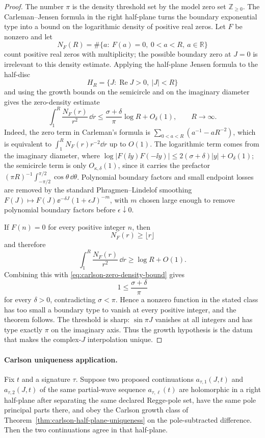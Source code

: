 \begin{proof}
The number \(\pi\) is the density threshold set by the model zero set
\(\mathbb Z_{\ge0}\).  The Carleman--Jensen formula in the right half-plane
turns the boundary exponential type into a bound on the logarithmic density of
positive real zeros.  Let \(F\) be nonzero and let
\[
  N_F(R)=\#\{a:\ F(a)=0,\ 0<a<R,\ a\in\mathbb R\}
\]
count positive real zeros with multiplicity; the possible boundary zero at
\(J=0\) is irrelevant to this density estimate.  Applying the half-plane
Jensen formula to the half-disc
\[
  H_R=\{J:\operatorname{Re}J>0,\ |J|<R\}
\]
and using the growth bounds on the semicircle and on the imaginary diameter
gives the zero-density estimate
\begin{equation}
  \int_1^R \frac{N_F(r)}{r^2}\,\dd r
  \le
  \frac{\sigma+\delta}{\pi}\log R+O_\delta(1),
  \qquad R\to\infty .
  \label{eq:carlson-zero-density-bound}
\end{equation}
Indeed, the zero term in Carleman's formula is
\(\sum_{0<a<R}(a^{-1}-aR^{-2})\), which is equivalent to
\(\int_1^R N_F(r)r^{-2}\dd r\) up to \(O(1)\).  The logarithmic term comes
from the imaginary diameter, where
\(\log |F(\ii y)F(-\ii y)|\le 2(\sigma+\delta)|y|+O_\delta(1)\); the
semicircle term is only \(O_{\kappa,\delta}(1)\), since it carries the prefactor
\((\pi R)^{-1}\int_{-\pi/2}^{\pi/2}\cos\theta\,\dd\theta\).  Polynomial
boundary factors and small endpoint losses are removed by the standard
Phragmen--Lindelof smoothing
\(F(J)\mapsto F(J)\ee^{-\delta J}(1+\epsilon J)^{-m}\), with \(m\) chosen
large enough to remove polynomial boundary factors before
\(\epsilon\downarrow0\).

If \(F(n)=0\) for every positive integer \(n\), then
\[
  N_F(r)\ge \lfloor r\rfloor
\]
and therefore
\[
  \int_1^R\frac{N_F(r)}{r^2}\,\dd r
  \ge
  \log R+O(1).
\]
Combining this with \eqref{eq:carlson-zero-density-bound} gives
\[
  1\le\frac{\sigma+\delta}{\pi}
\]
for every \(\delta>0\), contradicting \(\sigma<\pi\).  Hence a nonzero
function in the stated class has too small a boundary type to vanish at every
positive integer, and the theorem follows.  The threshold is sharp:
\(\sin\pi J\) vanishes at all integers and has type exactly \(\pi\) on the
imaginary axis.  Thus the growth hypothesis is the datum that makes the
complex-\(J\) interpolation unique.
\end{proof}

\paragraph{Carlson uniqueness application.}
Fix \(t\) and a signature \(\tau\).  Suppose two proposed continuations
\(a_{\tau,1}(J,t)\) and \(a_{\tau,2}(J,t)\) of the same partial-wave
sequence \(a_{\tau,\ell}(t)\) are holomorphic in a right half-plane after
separating the same declared Regge-pole set, have the same pole principal
parts there, and obey the Carlson growth class of
Theorem~\ref{thm:carlson-half-plane-uniqueness} on the pole-subtracted
difference.  Then the two continuations agree in that half-plane.

